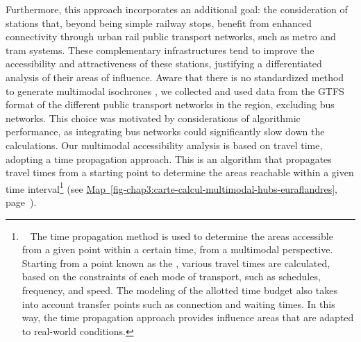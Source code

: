 \begin{refsegment}
Furthermore, this approach incorporates an additional goal: the consideration of stations that, beyond being simple railway stops, benefit from enhanced connectivity through urban rail public transport networks, such as metro and tram systems. These complementary infrastructures tend to improve the accessibility and attractiveness of these stations, justifying a differentiated analysis of their areas of influence. Aware that there is no standardized method to generate multimodal isochrones \textcolor{blue}{\autocite[5]{krismer_enhancing_2017}}, we collected and used data from the \acrfull{GTFS} format of the different public transport networks in the region, excluding bus networks. This choice was motivated by considerations of algorithmic performance, as integrating bus networks could significantly slow down the calculations. Our multimodal accessibility analysis is based on travel time, adopting a time propagation approach. This is an algorithm that propagates travel times from a starting point to determine the areas reachable within a given time interval\footnote{~
    The time propagation method is used to determine the areas accessible from a given point within a certain time, from a multimodal perspective. Starting from a point known as the , various travel times are calculated, based on the constraints of each mode of transport, such as schedules, frequency, and speed. The modeling of the allotted time budget also takes into account transfer points such as connection and waiting times. In this way, the time propagation approach provides influence areas that are adapted to real-world conditions.
} (see \hyperref[fig-chap3:carte-calcul-multimodal-hubs-euraflandres]{Map~\ref{fig-chap3:carte-calcul-multimodal-hubs-euraflandres}}, page~\pageref{fig-chap3:carte-calcul-multimodal-hubs-euraflandres}).%


\end{refsegment}
